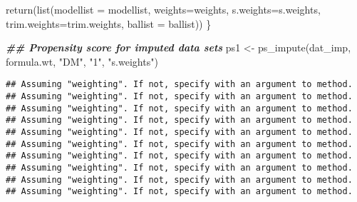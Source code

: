 \documentclass[
]{book}
\newenvironment{Shaded}{\begin{snugshade}}{\end{snugshade}}
\newcommand{\AttributeTok}[1]{\textcolor[rgb]{0.77,0.63,0.00}{#1}}
\newcommand{\ControlFlowTok}[1]{\textcolor[rgb]{0.13,0.29,0.53}{\textbf{#1}}}
\newcommand{\DocumentationTok}[1]{\textcolor[rgb]{0.56,0.35,0.01}{\textbf{\textit{#1}}}}
\newcommand{\FunctionTok}[1]{\textcolor[rgb]{0.00,0.00,0.00}{#1}}
\newcommand{\NormalTok}[1]{#1}
\newcommand{\OtherTok}[1]{\textcolor[rgb]{0.56,0.35,0.01}{#1}}
\newcommand{\SpecialCharTok}[1]{\textcolor[rgb]{0.00,0.00,0.00}{#1}}
\newcommand{\StringTok}[1]{\textcolor[rgb]{0.31,0.60,0.02}{#1}}
\theoremstyle{definition}
\theoremstyle{definition}
\theoremstyle{definition}
\theoremstyle{definition}
\theoremstyle{remark}
\begin{document}
\begin{Shaded}
\begin{Highlighting}[]
  \FunctionTok{return}\NormalTok{(}\FunctionTok{list}\NormalTok{(}\AttributeTok{modellist =}\NormalTok{ modellist, }\AttributeTok{weights=}\NormalTok{weights, }\AttributeTok{s.weights=}\NormalTok{s.weights, }\AttributeTok{trim.weights=}\NormalTok{trim.weights, }\AttributeTok{ballist =}\NormalTok{ ballist))}
\NormalTok{\}}
\end{Highlighting}
\end{Shaded}

\begin{Shaded}
\end{Shaded}

\begin{Shaded}
\begin{Highlighting}[]
\DocumentationTok{\#\# Propensity score for imputed data sets}
\NormalTok{ps1 }\OtherTok{\textless{}{-}} \FunctionTok{ps\_impute}\NormalTok{(dat\_imp, formula.wt, }\StringTok{"DM"}\NormalTok{, }\StringTok{"1"}\NormalTok{, }\StringTok{"s.weights"}\NormalTok{)}
\end{Highlighting}
\end{Shaded}

\begin{verbatim}
## Assuming "weighting". If not, specify with an argument to method.
## Assuming "weighting". If not, specify with an argument to method.
## Assuming "weighting". If not, specify with an argument to method.
## Assuming "weighting". If not, specify with an argument to method.
## Assuming "weighting". If not, specify with an argument to method.
## Assuming "weighting". If not, specify with an argument to method.
## Assuming "weighting". If not, specify with an argument to method.
## Assuming "weighting". If not, specify with an argument to method.
## Assuming "weighting". If not, specify with an argument to method.
## Assuming "weighting". If not, specify with an argument to method.
\end{verbatim}
\end{document}
